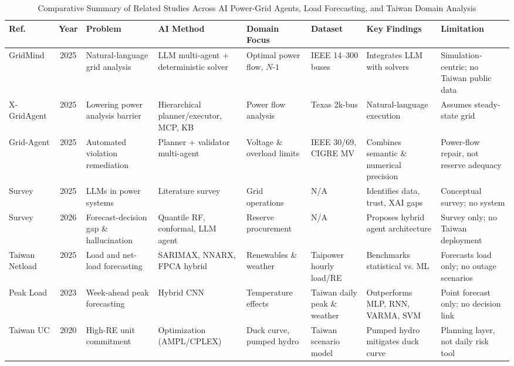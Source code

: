 \documentclass[conference]{IEEEtran}
\begin{document}
\begin{table}[t]
\centering
\caption{Comparative Summary of Related Studies Across AI Power-Grid Agents, Load Forecasting, and Taiwan Domain Analysis}
\label{tab:related_work}
\renewcommand{\arraystretch}{1.15}
\begin{tabularx}{\textwidth}{@{}p{1.55cm}cp{2.1cm}>{\raggedright\arraybackslash}X>{\raggedright\arraybackslash}X p{1.9cm}>{\raggedright\arraybackslash}X>{\raggedright\arraybackslash}X@{}}
\toprule
\textbf{Ref.} & \textbf{Year} & \textbf{Problem} & \textbf{AI Method} & \textbf{Domain Focus} & \textbf{Dataset} & \textbf{Key Findings} & \textbf{Limitation} \\
\midrule
\cite{ref20} GridMind & 2025 & Natural-language grid analysis & LLM multi-agent + deterministic solver & Optimal power flow, $N\text{-}1$ & IEEE 14--300 buses & Integrates LLM with solvers & Simulation-centric; no Taiwan public data \\
\cite{ref21} X-GridAgent & 2025 & Lowering power analysis barrier & Hierarchical planner/executor, MCP, KB & Power flow analysis & Texas 2k-bus & Natural-language execution & Assumes steady-state grid \\
\cite{ref22} Grid-Agent & 2025 & Automated violation remediation & Planner + validator multi-agent & Voltage \& overload limits & IEEE 30/69, CIGRE MV & Combines semantic \& numerical precision & Power-flow repair, not reserve adequacy \\
\cite{ref23} Survey & 2025 & LLMs in power systems & Literature survey & Grid operations & N/A & Identifies data, trust, XAI gaps & Conceptual survey; no system \\
\cite{ref24} Survey & 2026 & Forecast-decision gap \& hallucination & Quantile RF, conformal, LLM agent & Reserve procurement & N/A & Proposes hybrid agent architecture & Survey only; no Taiwan deployment \\
\cite{ref26} Taiwan Netload & 2025 & Load and net-load forecasting & SARIMAX, NNARX, FPCA hybrid & Renewables \& weather & Taipower hourly load/RE & Benchmarks statistical vs. ML & Forecasts load only; no outage scenarios \\
\cite{ref27} Peak Load & 2023 & Week-ahead peak forecasting & Hybrid CNN & Temperature effects & Taiwan daily peak \& weather & Outperforms MLP, RNN, VARMA, SVM & Point forecast only; no decision link \\
\cite{ref28} Taiwan UC & 2020 & High-RE unit commitment & Optimization (AMPL/CPLEX) & Duck curve, pumped hydro & Taiwan scenario model & Pumped hydro mitigates duck curve & Planning layer, not daily risk tool \\

\end{tabularx}
\end{table}
\end{document}

